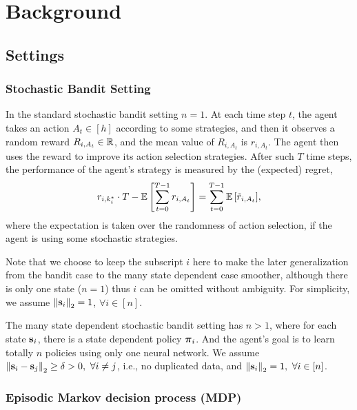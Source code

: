 \section{Background}
\label{sec:background}

\subsection{Settings}
\label{subsec:settings}

\subsubsection{Stochastic Bandit Setting}

In the standard stochastic bandit setting $n = 1$. At each time step $t$, the agent takes an action $A_t \in [h]$ according to some strategies, and then it observes a random reward $R_{i, A_t} \in {\mathbb{R}}$, and the mean value of $R_{i, A_t}$ is $r_{i, A_t}$. The agent then uses the reward to improve its action selection strategies. After such $T$ time steps, the performance of the agent's strategy is measured by the (expected) regret,
\begin{equation}
\label{eq:expected_regret}
    r_{i,k_i^*} \cdot T - {\mathbb{E}} \left[ \sum\limits_{t=0}^{T-1}{  r_{i, A_t}  } \right] = \sum\limits_{t=0}^{T-1}{ {\mathbb{E}} \left[ \tilde{r}_{i, A_t} \right] },
\end{equation}
where the expectation is taken over the randomness of action selection, if the agent is using some stochastic strategies.

Note that we choose to keep the subscript $i$ here to make the later generalization from the bandit case to the many state dependent case smoother, although there is only one state ($n = 1$) thus $i$ can be omitted without ambiguity. For simplicity, we assume $\left\| {\mathbf{s}}_{i} \right\|_2 = 1$, $\forall i \in [n]$.

The many state dependent stochastic bandit setting has $n > 1$, where for each state ${\mathbf{s}}_i$, there is a state dependent policy ${\boldsymbol{\pi}}_i$. And the agent's goal is to learn totally $n$ policies using only one neural network. We assume $\left\| {\mathbf{s}}_{i} -  {\mathbf{s}}_{j} \right\|_2 \ge \delta > 0 , \ \forall i \not= j$, i.e., no duplicated data, and $\left\| {\mathbf{s}}_{i} \right\|_2 = 1, \ \forall i \in [n]$.

\subsubsection{Episodic Markov decision process (MDP)}

